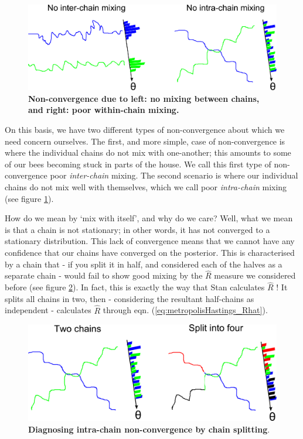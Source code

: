 \documentclass[11pt,fullpage]{book}
\begin{document}
\begin{figure}
\centerline{\includegraphics[width=1\textwidth]{metropolisHastings_twoTypesNonConvergence.pdf}}
\caption{\textbf{Non-convergence due to left: no mixing between chains, and right: poor within-chain mixing.}}\label{fig:metropolisHastings_twoTypesNonConvergence}
\end{figure}

On this basis, we have two different types of non-convergence about which we need concern ourselves. The first, and more simple, case of non-convergence is where the individual chains do not mix with one-another; this amounts to some of our bees becoming stuck in parts of the house. We call this first type of non-convergence poor \textit{inter-chain} mixing. The second scenario is where our individual chains do not mix well with themselves, which we call poor \textit{intra-chain} mixing (see figure \ref{fig:metropolisHastings_twoTypesNonConvergence}). 

How do we mean by `mix with itself', and why do we care? Well, what we mean is that a chain is not stationary; in other words, it has not converged to a stationary distribution. This lack of convergence means that we cannot have any confidence that our chains have converged on the posterior. This is characterised by a chain that - if you split it in half, and considered each of the halves as a separate chain - would fail to show good mixing by the $\hat{R}$ measure we considered before (see figure \ref{fig:metropolisHastings_splitChains}). In fact, this is exactly the way that Stan calculates $\hat{R}$ \cite{stan-manual:2015}! It splits all chains in two, then - considering the resultant half-chains as independent - calculates $\hat{R}$ through eqn. (\ref{eq:metropolisHastings_Rhat}).

\begin{figure}
\centerline{\includegraphics[width=1\textwidth]{metropolisHastings_splitChains.pdf}}
\caption{\textbf{Diagnosing intra-chain non-convergence by chain splitting}.}\label{fig:metropolisHastings_splitChains}
\end{figure}
\end{document}
